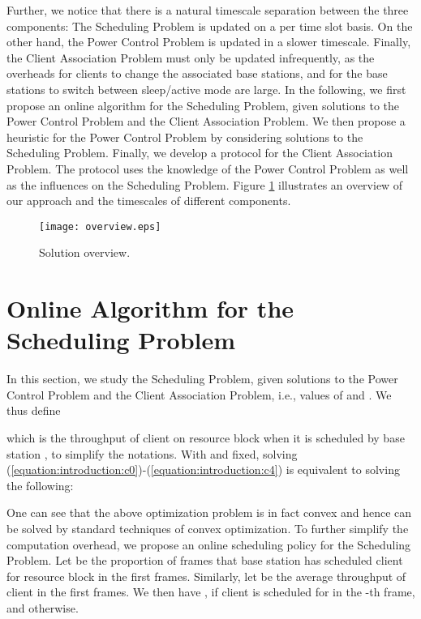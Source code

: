 \documentclass[conference]{IEEEtran}
\begin{document}
Further, we notice that there is a natural timescale separation between the three components: The Scheduling Problem is updated on a per time slot basis. On the other hand, the Power Control Problem is updated in a slower timescale. Finally, the Client Association Problem must only be updated infrequently, as the overheads for clients to change the associated base stations, and for the base stations to switch between sleep/active mode are large. In the following, we first propose an online algorithm for the Scheduling Problem, given solutions to the Power Control Problem and the Client Association Problem. We then propose a heuristic for the Power Control Problem by considering solutions to the Scheduling Problem. Finally, we develop a protocol for the Client Association Problem. The protocol uses the knowledge of the Power Control Problem as well as the influences on the Scheduling Problem. Figure \ref{fig:overview} illustrates an overview of our approach and the timescales of different components.

\begin{figure}[t]
\centering
\texttt{[image: overview.eps]}
\caption{Solution overview.}
\label{fig:overview}
\end{figure}


\section{Online Algorithm for the Scheduling Problem}
\label{section:scheduling}

In this section, we study the Scheduling Problem, given solutions to the Power Control Problem and the Client Association Problem, i.e., values of  and . We thus define

which is the throughput of client  on resource block  when it is scheduled by base station , to simplify the notations. With  and  fixed, solving (\ref{equation:introduction:c0})-(\ref{equation:introduction:c4}) is equivalent to solving the following:



One can see that the above optimization problem is in fact convex and hence can be solved by standard techniques of convex optimization. To further simplify the computation overhead, we propose an online scheduling policy for the Scheduling
Problem. Let  be the proportion of frames that base station  has scheduled client  for resource block  in the first  frames. Similarly, let  be the average throughput of client  in the first  frames. We then have , if client  is scheduled for  in the -th frame, and  otherwise.
\end{document}
